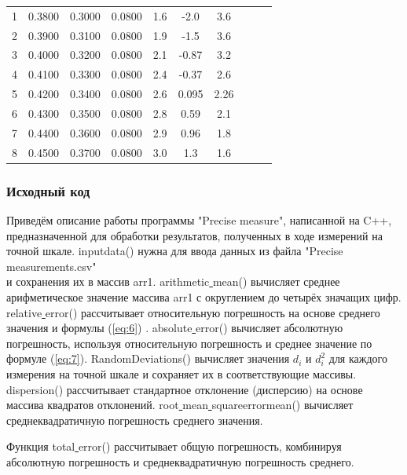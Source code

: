 \begin{center}
\begin{table}[H]
\begin{tabular}{|c|c|c|c|c|c|c|c|c|c|}
\begin{minipage}{21mm}
\end{minipage}\\
\hline
1 &  0.3800  &  0.3000  & 0.0800 & 1.6& -2.0&3.6 & & & \\
2 &  0.3900  &  0.3100  &  0.0800 & 1.9& -1.5&3.6 & & &\\
3 &  0.4000  &  0.3200  & 0.0800  & 2.1& -0.87&3.2 & & &\\
4 & 0.4100  &  0.3300 &  0.0800 & 2.4& -0.37&2.6  & & &\\
5 & 0.4200  &  0.3400  &  0.0800 &  2.6&0.095 &2.26 & & &  \\
6 & 0.4300  &  0.3500  &  0.0800 & 2.8&0.59 &2.1 & & & \\
7 & 0.4400  &  0.3600  &  0.0800 & 2.9&0.96 &1.8 & & &  \\
8 & 0.4500  &  0.3700  &  0.0800 & 3.0& 1.3 &1.6 & & &  \\

\hline
\end{tabular}
\end{table}
\end{center}

\subsubsection{Исходный код}
Приведём описание работы программы "Precise measure", написанной на C++, предназначенной для обработки результатов, полученных в ходе измерений на точной шкале. 
 inputdata() нужна для ввода данных из файла "Precise measurements.csv" \\и сохранения их в массив arr1.
 arithmetic\underline{ }mean() вычисляет среднее арифметическое значение массива arr1 с округлением до четырёх значащих цифр.
 relative\underline{ }error() рассчитывает относительную погрешность на основе среднего значения и формулы (\ref{eq:6}) .
 absolute\underline{ }error() вычисляет абсолютную погрешность, используя относительную погрешность и среднее значение по формуле (\ref{eq:7}).
 RandomDeviations() вычисляет значения $d_i$ и $d_i^2$ для каждого измерения на точной шкале и сохраняет их в соответствующие массивы.
 dispersion() рассчитывает стандартное отклонение (дисперсию) на основе массива квадратов отклонений.
 root\underline{ }mean\underline{ }square\underline{}error\underline{}mean() вычисляет среднеквадратичную погрешность среднего значения.

Функция total\underline{ }error() рассчитывает общую погрешность, комбинируя абсолютную погрешность и среднеквадратичную погрешность среднего.

